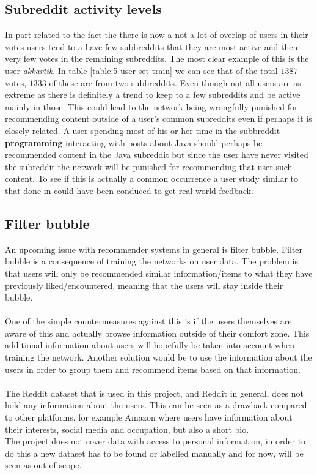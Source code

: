 \subsection{Subreddit activity levels}
In part related to the fact the there is now a not a lot of overlap of users in their votes users tend to a have few subbreddits that they are most active and then very few votes in the remaining subreddits. The most clear example of this is the user \textit{akkartik}. In table \ref{table:5-user-set-train} we can see that of the total $1387$ votes, $1333$ of these are from two subbreddits. Even though not all users are as extreme as there is definitely a trend to keep to a few subreddits and be active mainly in those. This could lead to the network being wrongfully punished for recommending content outside of a user's common subreddits even if perhaps it is closely related. A user spending most of his or her time in the subbreddit \textbf{programming} interacting with posts about Java should perhaps be recommended content in the Java subreddit but since the user have never visited the subreddit the network will be punished for recommending that user such content. To see if this is actually a common occurrence a user study similar to that done in \parencite{suorra2016assisting} could have been conduced to get real world feedback.

\subsection{Filter bubble}
An upcoming issue with recommender systems in general is filter bubble. \parencite{nguyen2014exploring}
Filter bubble is a consequence of training the networks on user data. The problem is that users will only be recommended similar information/items to what they have previously liked/encountered, meaning that the users will stay inside their bubble. 
\\\\
One of the simple countermeasures against this is if the users themselves are aware of this and actually browse information outside of their comfort zone. This additional information about users will hopefully be taken into account when training the network. Another solution would be to use the information about the users in order to group them and recommend items based on that information.
\\\\
The Reddit dataset that is used in this project, and Reddit in general, does not hold any information about the users. This can be seen as a drawback compared to other platforms, for example Amazon where users have information about their interests, social media and occupation, but also a short bio. \\
The project does not cover data with access to personal information, in order to do this a new dataset has to be found or labelled manually and for now, will be seen as out of scope.


